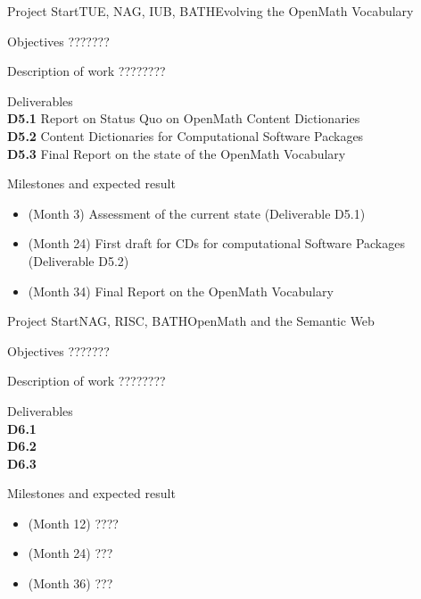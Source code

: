 \documentclass{euproposal}
\begin{document}
\begin{workpackage}{36}{5}{Project Start}{TUE, NAG, IUB, BATH}{Evolving the OpenMath Vocabulary} 
\begin{wpbox}{Objectives}
???????
\end{wpbox}
\begin{wpbox}{Description of work}
  ????????
\end{wpbox}
\begin{wpbox}{Deliverables\\}
{\bf D5.1} Report on Status Quo on OpenMath Content Dictionaries\\
{\bf D5.2} Content Dictionaries for Computational Software Packages\\
{\bf D5.3} Final Report on the state of the OpenMath Vocabulary\\
\end{wpbox}
\begin{wpbox}{Milestones and expected result}
\begin{itemize}
\item (Month 3) Assessment of the current state (Deliverable D5.1)
\item (Month 24) First draft for CDs for computational Software Packages
  (Deliverable D5.2)
\item (Month 34) Final Report on the OpenMath Vocabulary
\end{itemize}
\end{wpbox}
\end{workpackage}
\newpage
\begin{workpackage}{36}{6}{Project Start}{NAG, RISC, BATH}{OpenMath and the Semantic Web}
\begin{wpbox}{Objectives}
???????
\end{wpbox}
\begin{wpbox}{Description of work}
  ????????
\end{wpbox}
\begin{wpbox}{Deliverables\\}
{\bf D6.1} \\
{\bf D6.2} \\
{\bf D6.3} 
\end{wpbox}
\begin{wpbox}{Milestones and expected result}
\begin{itemize}
\item (Month 12) ????
\item (Month 24) ???
\item (Month 36) ???
\end{itemize}
\end{wpbox}
\end{workpackage}
\newpage
\end{document}
